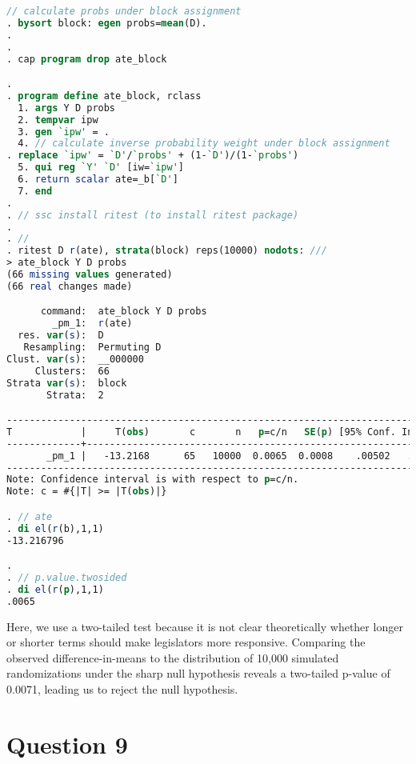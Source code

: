 \documentclass[11pt,notitlepage]{article}\usepackage[]{graphicx}\usepackage[]{color}
\begin{document}
\begin{enumerate}[a)]
\begin{lstlisting}[language=stata]
 // calculate probs under block assignment
. bysort block: egen probs=mean(D). 
. 
. 
. cap program drop ate_block

. 
. program define ate_block, rclass
  1. args Y D probs
  2. tempvar ipw
  3. gen `ipw' = .
  4. // calculate inverse probability weight under block assignment
. replace `ipw' = `D'/`probs' + (1-`D')/(1-`probs')
  5. qui reg `Y' `D' [iw=`ipw']
  6. return scalar ate=_b[`D']
  7. end 
. 
. // ssc install ritest (to install ritest package)
. 
. //
. ritest D r(ate), strata(block) reps(10000) nodots: ///
> ate_block Y D probs
(66 missing values generated)
(66 real changes made)

      command:  ate_block Y D probs
        _pm_1:  r(ate)
  res. var(s):  D
   Resampling:  Permuting D
Clust. var(s):  __000000
     Clusters:  66
Strata var(s):  block
       Strata:  2

------------------------------------------------------------------------------
T            |     T(obs)       c       n   p=c/n   SE(p) [95% Conf. Interval]
-------------+----------------------------------------------------------------
       _pm_1 |   -13.2168      65   10000  0.0065  0.0008    .00502   .0082774
------------------------------------------------------------------------------
Note: Confidence interval is with respect to p=c/n.
Note: c = #{|T| >= |T(obs)|}

. // ate
. di el(r(b),1,1)
-13.216796

. 
. // p.value.twosided
. di el(r(p),1,1)
.0065
\end{lstlisting}

Here, we use a two-tailed test because it is not clear theoretically whether longer or shorter terms should make legislators more responsive. Comparing the observed difference-in-means to the distribution of 10,000 simulated randomizations under the sharp null hypothesis reveals a two-tailed p-value of 0.0071, leading us to reject the null hypothesis. 
\end{enumerate}

\section*{Question 9}
\end{document}
